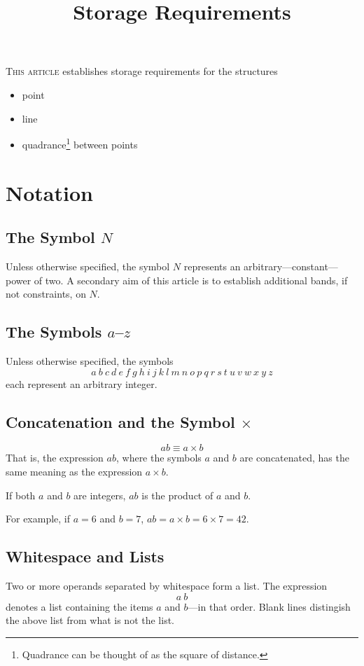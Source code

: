 \documentclass{article}
\title{Storage Requirements}
\begin{document}
\newcommand{\en}{\phantom{N}}
\maketitle
\noindent
\textsc{This article}
establishes storage requirements for the structures
\begin{itemize}
\item point
\item line
\item quadrance\footnote{Quadrance can be thought of as the square of distance.} between points
\end{itemize}
\section{Notation}
\subsection{The Symbol $N$}
Unless otherwise specified, the symbol $N$ represents an
arbitrary---constant---power of two.
A secondary aim of this article is to establish additional bands,
if not constraints, on $N$.

\subsection{The Symbols $a$--$z$}
Unless otherwise specified, the symbols
$$a\ b\ c\ d\ e\ f\ g\ h\ i\ j\ k\ l\ m\ n\ o\ p\ q\ r\ s\ t\ u\ v\ w\ x\ y\ z$$
each represent an arbitrary integer.

\subsection{Concatenation and the Symbol $\times$}
$$ab \equiv a\times b$$
That is,
the expression $ab$,
where the symbols $a$ and $b$ are concatenated,
has the same meaning as the expression $a\times b$.

If both $a$ and $b$ are integers, $ab$ is the product of $a$ and $b$.

For example, if $a=6$ and $b=7$, $ab=a\times b=6\times 7=42$.
\subsection{Whitespace and Lists}
Two or more operands separated by whitespace form a list.
The expression
$$a\ b$$
denotes a list containing the items $a$ and $b$---in that order.
Blank lines distingish the above list from what is not the list.
\end{document}
